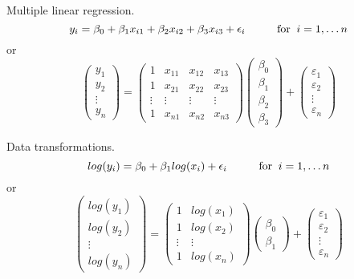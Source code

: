 \bexa
Multiple linear regression.
$$
y_i = \beta_0 + \beta_1 x_{i1} + \beta_2 x_{i2} + \beta_3 x_{i3} + \epsilon_i  \hskip1cm {\mbox{for}} \; \;  i = 1,\ldots n
$$
or
$$
\left( \begin{array}{c} y_1 \\ y_2 \\ \vdots \\ y_n \end{array} \right) =
\left( \begin{array}{cccc}
1 & x_{11} & x_{12} & x_{13} \\
1 & x_{21} & x_{22} & x_{23} \\
\vdots & \vdots & \vdots & \vdots \\
1 & x_{n1} & x_{n2} & x_{n3}
\end{array} \right)
\left( \begin{array}{c} \beta_0 \\ \beta_1 \\ \beta_2 \\ \beta_3 \end{array} \right) +
\left( \begin{array}{c} \varepsilon_1 \\ \varepsilon_2 \\ \vdots \\ 
	\varepsilon_n \end{array} \right) 
$$
\esexa

\bexa
%
%
Data transformations.
$$
log(y_i) = \beta_0 + \beta_1 log(x_i) + \epsilon_i  \hskip1cm {\mbox{for}} \; \;  i = 1,\ldots n
$$
or
$$
\left( \begin{array}{c} log(y_1) \\ log(y_2) \\ \vdots \\ log(y_n) \end{array} \right) =
\left( \begin{array}{cc}
1 & log(x_1) \\ 
1 & log(x_2) \\ 
\vdots & \vdots \\ 
1 & log(x_n)
\end{array} \right)
\left( \begin{array}{c} \beta_0 \\ \beta_1 \end{array} \right) +
\left( \begin{array}{c} \varepsilon_1 \\ \varepsilon_2 \\ \vdots \\ 
	\varepsilon_n \end{array} \right) 
$$
\esexa

